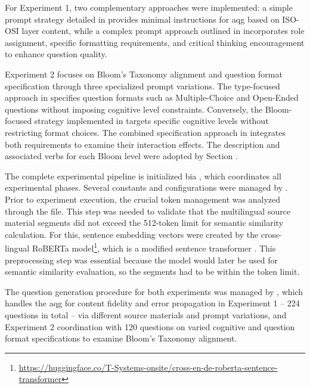 For Experiment 1, two complementary approaches were implemented: a simple prompt strategy detailed in  provides minimal instructions for \ac{aqg} based on ISO-OSI layer content, while a complex prompt approach outlined in  incorporates role assignment, specific formatting requirements, and critical thinking encouragement to enhance question quality.

\pagebreak

Experiment 2 focuses on Bloom's Taxonomy alignment and question format specification through three specialized prompt variations. The type-focused approach in  specifies question formats such as Multiple-Choice and Open-Ended questions without imposing cognitive level constraints. Conversely, the Bloom-focused strategy implemented in  targets specific cognitive levels without restricting format choices. The combined specification approach in  integrates both requirements to examine their interaction effects. The description and associated verbs for each Bloom level were adopted by Section .

The complete experimental pipeline is initialized bia , which coordinates all experimental phases. Several constants and configurations were managed by . Prior to experiment execution, the crucial token management was analyzed through the  file. This step was needed to validate that the multilingual source material segments did not exceed the 512-token limit for semantic similarity calculation. For this, sentence embedding vectors were created by the cross-lingual RoBERTa model\footnote{\url{https://huggingface.co/T-Systems-onsite/cross-en-de-roberta-sentence-transformer}}, which is a modified sentence transformer \cite{reimers_sentence-bert_2019}. This preprocessing step was essential because the model would later be used for semantic similarity evaluation, so the segments had to be within the token limit.

The question generation procedure for both experiments was managed by , which handles the \ac{aqg} for content fidelity and error propagation in Experiment 1 -- 224 questions in total -- via different source materials and prompt variations, and Experiment 2 coordination with 120 questions on varied cognitive and question format specifications to examine Bloom's Taxonomy alignment.

